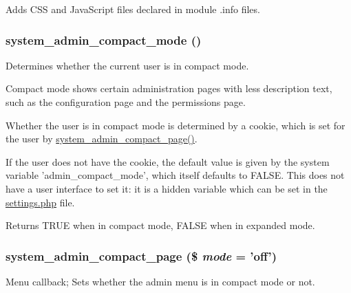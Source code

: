 \label{system_8module_a18ac9a2acd0bfebb08156b711c8451a3}
Adds CSS and JavaScript files declared in module .info files. \hypertarget{system_8module_a5c5f93aebe3f12a47ceab948b0a92237}{
\subsubsection[{system\_\-admin\_\-compact\_\-mode}]{\setlength{\rightskip}{0pt plus 5cm}system\_\-admin\_\-compact\_\-mode ()}}
\label{system_8module_a5c5f93aebe3f12a47ceab948b0a92237}
Determines whether the current user is in compact mode.

Compact mode shows certain administration pages with less description text, such as the configuration page and the permissions page.

Whether the user is in compact mode is determined by a cookie, which is set for the user by \hyperlink{system_8module_ab1957cfd893fb50794286ea7c84589e6}{system\_\-admin\_\-compact\_\-page()}.

If the user does not have the cookie, the default value is given by the system variable 'admin\_\-compact\_\-mode', which itself defaults to FALSE. This does not have a user interface to set it: it is a hidden variable which can be set in the \hyperlink{settings_8php}{settings.php} file.

\begin{DoxyReturn}{Returns}
TRUE when in compact mode, FALSE when in expanded mode. 
\end{DoxyReturn}
\hypertarget{system_8module_ab1957cfd893fb50794286ea7c84589e6}{
\subsubsection[{system\_\-admin\_\-compact\_\-page}]{\setlength{\rightskip}{0pt plus 5cm}system\_\-admin\_\-compact\_\-page (\$ {\em mode} = {\ttfamily 'off'})}}
\label{system_8module_ab1957cfd893fb50794286ea7c84589e6}
Menu callback; Sets whether the admin menu is in compact mode or not.


